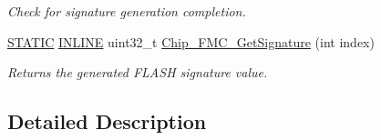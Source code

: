 \begin{DoxyCompactItemize}
\begin{DoxyCompactList}\small\item\em Check for signature generation completion. \end{DoxyCompactList}\item 
\hyperlink{group__LPC__Types__Public__Macros_ga10b2d890d871e1489bb02b7e70d9bdfb}{S\-T\-A\-T\-I\-C} \hyperlink{group__LPC__Types__Public__Types_ga2eb6f9e0395b47b8d5e3eeae4fe0c116}{I\-N\-L\-I\-N\-E} uint32\-\_\-t \hyperlink{group__FMC__17XX__40XX_ga800317f87d55b213bdbd9aebe7c2a6b6}{Chip\-\_\-\-F\-M\-C\-\_\-\-Get\-Signature} (int index)
\begin{DoxyCompactList}\small\item\em Returns the generated F\-L\-A\-S\-H signature value. \end{DoxyCompactList}\end{DoxyCompactItemize}


\subsection{Detailed Description}



